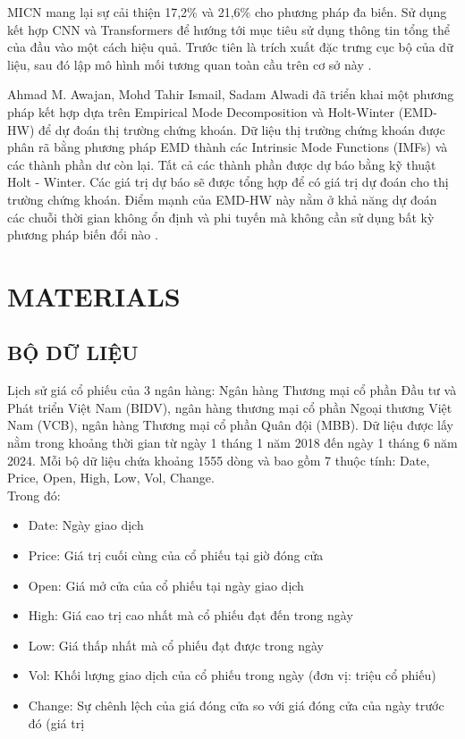 \documentclass[conference]{IEEEtran}
\begin{document}
MICN mang lại sự cải thiện 17,2\% và 21,6\% cho phương pháp đa biến. Sử dụng kết hợp CNN và Transformers để hướng tới mục tiêu sử dụng thông tin tổng thể của đầu vào một cách hiệu quả. Trước tiên là trích xuất đặc trưng cục bộ của dữ liệu, sau đó lập mô hình mối tương quan toàn cầu trên cơ sở này \cite{MICN}.

Ahmad M. Awajan, Mohd Tahir Ismail, Sadam Alwadi đã triển khai một phương pháp kết hợp dựa trên Empirical Mode Decomposition và Holt-Winter (EMD-HW) để dự đoán thị trường chứng khoán. Dữ liệu thị trường chứng khoán được phân rã bằng phương pháp EMD thành các Intrinsic Mode Functions (IMFs) và các thành phần dư còn lại. Tất cả các thành phần được dự báo bằng kỹ thuật Holt - Winter. Các giá trị dự báo sẽ được tổng hợp để có giá trị dự đoán cho thị trường chứng khoán. Điểm mạnh của EMD-HW này nằm ở khả năng dự đoán các chuỗi thời gian không ổn định và phi tuyến mà không cần sử dụng bất kỳ phương pháp biến đổi nào \cite{forecastingHoltWinter}.
\section{MATERIALS}
\subsection{BỘ DỮ LIỆU}
Lịch sử giá cổ phiếu của 3 ngân hàng: Ngân hàng Thương mại cổ phần Đầu tư và Phát triển Việt Nam (BIDV), ngân hàng thương mại cổ phần Ngoại thương Việt Nam (VCB), ngân hàng Thương mại cổ phần Quân đội (MBB). Dữ liệu được lấy nằm trong khoảng thời gian từ ngày 1 tháng 1 năm 2018 đến ngày 1 tháng 6 năm 2024. Mỗi bộ dữ liệu chứa khoảng 1555 dòng và bao gồm 7 thuộc tính: Date, Price, Open, High, Low, Vol, Change.\\
Trong đó: 
\begin{itemize}
    \item Date: Ngày giao dịch 
    \item Price: Giá trị cuối cùng của cổ phiếu tại giờ đóng cửa
    \item Open: Giá mở cửa của cổ phiếu tại ngày giao dịch
    \item High: Giá cao trị cao nhất mà cổ phiếu đạt đến trong ngày 
    \item Low: Giá thấp nhất mà cổ phiếu đạt được trong ngày
    \item Vol: Khối lượng giao dịch của cổ phiếu trong ngày (đơn vị: triệu cổ phiếu)
    \item Change: Sự chênh lệch của giá đóng cửa so với giá đóng cửa của ngày trước đó (giá trị %
\end{itemize}
\end{document}
